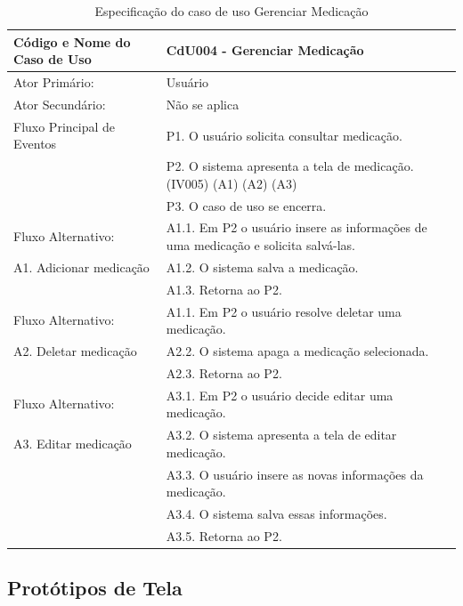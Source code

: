 \documentclass[12pt]{article}
\begin{document}
\begin{titlepage}
\begin{center}
\begin{table}[!h]
	\begin{center}
		\caption{Especificação do caso de uso Gerenciar Medicação}
		\begin{tabular}{ | l |  p{10cm} |}
			\hline
			Código e Nome do Caso de Uso & CdU004 - Gerenciar Medicação \\ \hline
			Ator Primário: & Usuário \\ 
			Ator Secundário: & Não se aplica \\ \hline
			Fluxo Principal de Eventos & P1. O usuário solicita consultar medicação. \\
						   & P2. O sistema apresenta a tela de medicação. (IV005) (A1) (A2) (A3) \\
						   & P3. O caso de uso se encerra. \\ \hline
			Fluxo Alternativo:         & A1.1. Em P2 o usuário insere as informações de uma medicação e solicita salvá-las. \\
			A1. Adicionar medicação    & A1.2. O sistema salva a medicação. \\ 
						   & A1.3. Retorna ao P2. \\ \hline
			Fluxo Alternativo:         & A1.1. Em P2 o usuário resolve deletar uma medicação. \\
			A2. Deletar medicação      & A2.2. O sistema apaga a medicação selecionada. \\
						   & A2.3. Retorna ao P2. \\ \hline
			Fluxo Alternativo:         & A3.1. Em P2 o usuário decide editar uma medicação. \\
			A3. Editar medicação       & A3.2. O sistema apresenta a tela de editar medicação. \\
						   & A3.3. O usuário insere as novas informações da medicação. \\
						   & A3.4. O sistema salva essas informações. \\
						   & A3.5. Retorna ao P2. \\
			\hline
		\end{tabular}
	\end{center}
\end{table}

\newpage

\subsection{Protótipos de Tela}


\end{center}
\end{titlepage}
\end{document}
